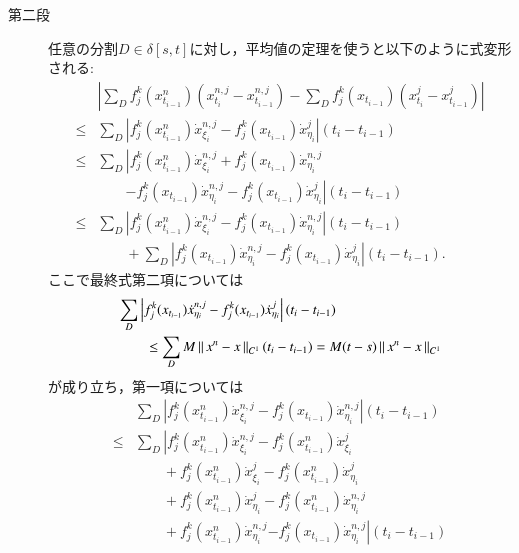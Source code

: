 \begin{prf}
\begin{description}
		\item[第二段]
			任意の分割$D \in \delta[s,t]$に対し，平均値の定理を使うと以下のように式変形される:
			\begin{align}
				&\left| \sum_D f^k_j(x^n_{t_{i-1}})(x^{n,j}_{t_i} - x^{n,j}_{t_{i-1}})
					- \sum_D f^k_j(x_{t_{i-1}})(x^j_{t_i} - x^j_{t_{i-1}}) \right| \\
				\leq &\sum_D \left| f^k_j(x^n_{t_{i-1}}) \dot{x}^{n,j}_{\xi_i} 
					- f^k_j(x_{t_{i-1}}) \dot{x}^j_{\eta_i} \right|(t_i - t_{i-1}) \\
				\leq &\sum_D \left| f^k_j(x^n_{t_{i-1}}) \dot{x}^{n,j}_{\xi_i} 
					+ f^k_j(x_{t_{i-1}}) \dot{x}^{n,j}_{\eta_i} \right.\\
					&\qquad \left.- f^k_j(x_{t_{i-1}}) \dot{x}^{n,j}_{\eta_i}
					- f^k_j(x_{t_{i-1}}) \dot{x}^j_{\eta_i} \right|(t_i - t_{i-1}) \\
				\leq &\sum_D \left| f^k_j(x^n_{t_{i-1}}) \dot{x}^{n,j}_{\xi_i} 
					- f^k_j(x_{t_{i-1}}) \dot{x}^{n,j}_{\eta_i} \right|(t_i - t_{i-1}) \\
					&\qquad + \sum_D \left|f^k_j(x_{t_{i-1}}) \dot{x}^{n,j}_{\eta_i}
					- f^k_j(x_{t_{i-1}}) \dot{x}^j_{\eta_i} \right|(t_i - t_{i-1}).
			\end{align}
			ここで最終式第二項については
			\begin{align}
				&\sum_D \left|f^k_j(x_{t_{i-1}}) \dot{x}^{n,j}_{\eta_i}
					- f^k_j(x_{t_{i-1}}) \dot{x}^j_{\eta_i} \right|(t_i - t_{i-1}) \\
				&\qquad \leq \sum_D M \left\|\, x^n - x\, \right\|_{C^1} (t_i - t_{i-1})
				= M (t - s) \left\|\, x^n - x\, \right\|_{C^1}
			\end{align}
			が成り立ち，第一項については
			\begin{align}
				&\sum_D \left| f^k_j(x^n_{t_{i-1}}) \dot{x}^{n,j}_{\xi_i} 
					- f^k_j(x_{t_{i-1}}) \dot{x}^{n,j}_{\eta_i} \right|(t_i - t_{i-1}) \\
				\leq &\sum_D \left| f^k_j(x^n_{t_{i-1}}) \dot{x}^{n,j}_{\xi_i} 
					- f^k_j(x^n_{t_{i-1}}) \dot{x}^{j}_{\xi_i} \right.\\
					&\qquad + f^k_j(x^n_{t_{i-1}}) \dot{x}^{j}_{\xi_i}
					- f^k_j(x^n_{t_{i-1}}) \dot{x}^{j}_{\eta_i} \\
					&\qquad + f^k_j(x^n_{t_{i-1}}) \dot{x}^{j}_{\eta_i}
					- f^k_j(x^n_{t_{i-1}}) \dot{x}^{n,j}_{\eta_i} \\
					&\qquad + f^k_j(x^n_{t_{i-1}}) \dot{x}^{n,j}_{\eta_i}
					\left. - f^k_j(x_{t_{i-1}}) \dot{x}^{n,j}_{\eta_i} \right|(t_i - t_{i-1}) \\

\end{align}
\end{description}
\end{prf}
